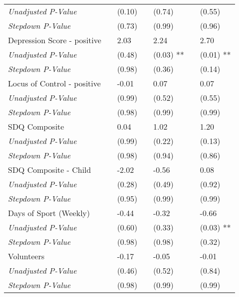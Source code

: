 \begin{tabular}{L{9cm} L{1cm} l L{1cm} l l l}
\quad \textit{Unadjusted P-Value} & & (0.10)  & & (0.74)  & & (0.55) \\
\quad \textit{Stepdown P-Value} & & (0.73)  & & (0.99)  & & (0.96) \\[3pt]
Depression Score - positive & & 2.03 & & 2.24  & & 2.70 \\
\quad \textit{Unadjusted P-Value} & & (0.48)  & & (0.03) ** & & (0.01) ** \\
\quad \textit{Stepdown P-Value} & & (0.98)  & & (0.36)  & & (0.14) \\[3pt]
Locus of Control - positive & & -0.01 & & 0.07  & & 0.07 \\
\quad \textit{Unadjusted P-Value} & & (0.99)  & & (0.52)  & & (0.55) \\
\quad \textit{Stepdown P-Value} & & (0.98)  & & (0.99)  & & (0.99) \\[3pt]
SDQ Composite & & 0.04 & & 1.02  & & 1.20 \\
\quad \textit{Unadjusted P-Value} & & (0.99)  & & (0.22)  & & (0.13) \\
\quad \textit{Stepdown P-Value} & & (0.98)  & & (0.94)  & & (0.86) \\[3pt]
SDQ Composite - Child & & -2.02 & & -0.56  & & 0.08 \\
\quad \textit{Unadjusted P-Value} & & (0.28)  & & (0.49)  & & (0.92) \\
\quad \textit{Stepdown P-Value} & & (0.95)  & & (0.99)  & & (0.99) \\[3pt]
Days of Sport (Weekly) & & -0.44 & & -0.32  & & -0.66 \\
\quad \textit{Unadjusted P-Value} & & (0.60)  & & (0.33)  & & (0.03) ** \\
\quad \textit{Stepdown P-Value} & & (0.98)  & & (0.98)  & & (0.32) \\[3pt]
Volunteers & & -0.17 & & -0.05  & & -0.01 \\
\quad \textit{Unadjusted P-Value} & & (0.46)  & & (0.52)  & & (0.84) \\
\quad \textit{Stepdown P-Value} & & (0.98)  & & (0.99)  & & (0.99) \\[3pt]
\bottomrule
\end{tabular}
